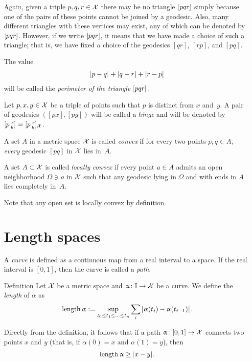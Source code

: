 Again, given a triple $p,q,r\in \spc{X}$ there may be no triangle 
$[pqr]$ simply because one of the pairs of these points cannot be joined by a geodesic.
Also, many different triangles with these vertices may exist, any of which can be denoted by $[pqr]$.
However, if we write $[pqr]$, it means that we have made a choice of such a triangle; 
that is, we have  fixed a choice of the geodesics $[q r]$, $[r p]$, and $[p q]$.

The value 
\[\dist{p}{q}{}+\dist{q}{r}{}+\dist{r}{p}{}\]
will be called the {}\emph{perimeter of the triangle} $[pqr]$.

Let $p,x,y\in \spc{X}$ be a triple of points such that $p$ is distinct from $x$ and~$y$.
A pair of geodesics $([p x],[p y])$ will be called  a \emph{hinge} and will be denoted by 
$[p\,{}^{x}_{y}]=[p\,{}^{x}_{y}]_{\mathcal{X}}$.


\label{def:convex-set}
A set $A$ in a metric space $\mathcal{X}$ is called 
\emph{convex}
if for every two points $p,q\in A$, 
{}\emph{every} geodesic $[pq]$ in $\mathcal{X}$ 
lies in~$A$.

A set $A\subset\spc{X}$ is called 
\emph{locally convex}
if every point $a\in A$ admits an open neighborhood $\Omega\ni a$ in $\mathcal{X}$ 
such that any geodesic lying in $\Omega$ and with ends in $A$ lies completely in~$A$.

Note that any open set is locally convex by  definition.



\section{Length spaces}\label{sec:intrinsic}

A \emph{curve} is defined as a continuous map from a real interval to a space.
If the real interval is $[0,1]$, then the curve is called a \emph{path}.

\begin{thm}{Definition}
Let $\mathcal{X}$ be a metric space and
$\alpha\: \II\to \spc{X}$ be a curve.
We define the \emph{length} of $\alpha$ as 
\[
\length \alpha \df \sup_{t_0\le t_1\le\ldots\le t_n}\sum_i \dist{\alpha(t_i)}{\alpha(t_{i-1})}{}.
\]
\end{thm}

Directly from the definition, it follows that if a path $\alpha\:[0,1]\to\spc{X}$ connects two points $x$ and $y$ 
(that is, if $\alpha(0)=x$ and $\alpha(1)=y$), then 
\[\length\alpha\ge \dist{x}{y}{}.\]

